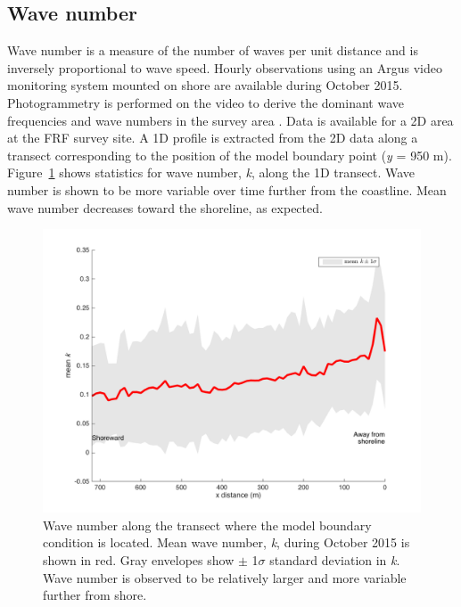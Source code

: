\subsection{Wave number}

Wave number is a measure of the number of waves per unit distance and is inversely proportional to wave speed. Hourly observations  using an Argus video monitoring system mounted on shore are available during October 2015. Photogrammetry is performed on the video to derive the dominant wave frequencies and wave numbers in the survey area \citep{holman2013}. Data is available for a 2D area at the FRF survey site. A 1D profile is extracted from the 2D data along a transect corresponding to the position of the model boundary point (\textit{y} = 950 m). Figure~\ref{k1Dmean} shows statistics for wave number, \textit{k}, along the 1D transect. Wave number is shown to be more variable over time further from the coastline. Mean wave number decreases toward the shoreline, as expected.



\begin{figure}[H]
\centering
\includegraphics[width=.55\linewidth]{img/k1Dmean_std.png}
\caption{Wave number along the transect where the model boundary condition is located. Mean wave number, \textit{k}, during October 2015 is shown in red. Gray envelopes show $\pm$ 1$\sigma$ standard deviation in \textit{k}. Wave number is observed to be relatively larger and more variable further from shore.}
\label{k1Dmean}
\end{figure}